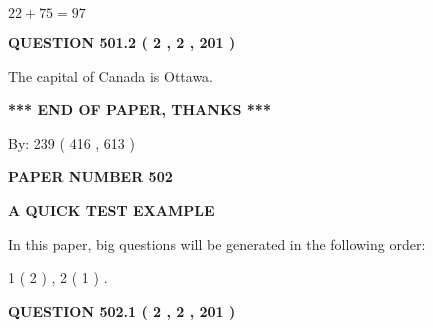 \documentclass[12pt]{article}
\begin{document}
$ %
22 +  %
75=   %
97$
 
 
  
\vspace{0.2in}
  
{\textbf{\Large{QUESTION
501.2 
 ( 2 , 2 , 201 )
}}}
  
  
 
 
\noindent{}
 
 
The capital of Canada is Ottawa.
 
 
 
 
   
   
 \vspace{0.2in}
 
   
   
   
   
\vspace{1.0in} 
{\textbf{\large{ *** END OF PAPER, THANKS *** }}} 
   
   
\hspace{1.0in} By: 
 239 ( 416 ,  613 )
   
   
   
   
\newpage 
\setcounter{page}{ 
   502001 } 
   
   
   
   
 {\textbf{ \Large{ PAPER NUMBER  502  }}}
   
   
\vspace{0.2in}
   
   
   
   
   
   
 \vspace{0.2in}
{\LARGE {\textbf{ A QUICK TEST EXAMPLE}}}
   
   
   
\vspace{0.2in}
   
In this paper, big questions will be generated in the following order: 
   
   
   1 ( 2 )
 ,
   2 ( 1 )
 .
  
\vspace{0.2in}
  
{\textbf{\Large{QUESTION
502.1 
 ( 2 , 2 , 201 )
}}}
  
  
 
 
\noindent{}
 
\end{document}
